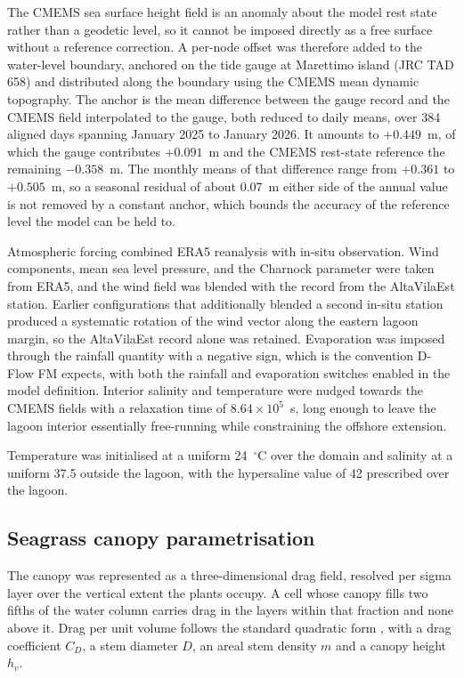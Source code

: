The CMEMS sea surface height field is an anomaly about the model rest state
rather than a geodetic level, so it cannot be imposed directly as a free
surface without a reference correction. A per-node offset was therefore added
to the water-level boundary, anchored on the tide gauge at Marettimo island
(JRC TAD 658) and distributed along the boundary using the CMEMS mean dynamic
topography. The anchor is the mean difference between the gauge record and the
CMEMS field interpolated to the gauge, both reduced to daily means, over 384
aligned days spanning January 2025 to January 2026. It amounts to
$+0.449$~m, of which the gauge contributes $+0.091$~m and the CMEMS rest-state
reference the remaining $-0.358$~m. The monthly means of that difference range
from $+0.361$ to $+0.505$~m, so a seasonal residual of about 0.07~m either side
of the annual value is not removed by a constant anchor, which bounds the
accuracy of the reference level the model can be held to.

Atmospheric forcing combined ERA5 reanalysis with in-situ observation. Wind
components, mean sea level pressure, and the Charnock parameter were taken
from ERA5, and the wind field was blended with the record from the
AltaVilaEst station. Earlier configurations that additionally blended a second
in-situ station produced a systematic rotation of the wind vector along the
eastern lagoon margin, so the AltaVilaEst record alone was retained.
Evaporation was imposed through the rainfall quantity with a negative sign,
which is the convention D-Flow FM expects, with both the rainfall and
evaporation switches enabled in the model definition. Interior salinity and
temperature were nudged towards the CMEMS fields with a relaxation time of
$8.64\times10^{5}$~s, long enough to leave the lagoon interior essentially
free-running while constraining the offshore extension.

Temperature was initialised at a uniform 24~$^\circ$C over the domain and
salinity at a uniform 37.5 outside the lagoon, with the hypersaline value of 42
prescribed over the lagoon.

\subsection{Seagrass canopy parametrisation}
\label{sec:methods_roughness}

The canopy was represented as a three-dimensional drag field, resolved per sigma
layer over the vertical extent the plants occupy. A cell whose canopy fills two
fifths of the water column carries drag in the layers within that fraction and
none above it. Drag per unit volume follows the standard quadratic form
\citep{Nepf2012}, with a drag coefficient $C_D$, a stem diameter $D$, an areal
stem density $m$ and a canopy height $h_v$.

